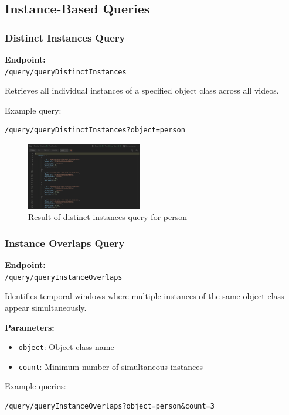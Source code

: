 \documentclass[conference]{IEEEtran}
\begin{document}
\subsection{Instance-Based Queries}
\subsubsection{Distinct Instances Query}
\textbf{Endpoint:} \\ 
\texttt{/query/queryDistinctInstances}

Retrieves all individual instances of a specified object class across all videos.

Example query:\\
\begin{minipage}{\linewidth}
\scriptsize
\begin{verbatim}
/query/queryDistinctInstances?object=person
\end{verbatim}
\end{minipage}

\begin{figure}[H]
    \centering
    \includegraphics[width=0.45\textwidth]{5.jpeg}
    \caption{Result of distinct instances query for person}
    \label{fig:query5}
\end{figure}

\subsubsection{Instance Overlaps Query}
\textbf{Endpoint:} \\ 
\texttt{/query/queryInstanceOverlaps}

Identifies temporal windows where multiple instances of the same object class appear simultaneously.

\textbf{Parameters:}
\begin{itemize}
    \item \texttt{object}: Object class name
    \item \texttt{count}: Minimum number of simultaneous instances
\end{itemize}

Example queries:\\
\begin{minipage}{\linewidth}
\scriptsize
\begin{verbatim}
/query/queryInstanceOverlaps?object=person&count=3
\end{verbatim}
\end{minipage}
\end{document}
